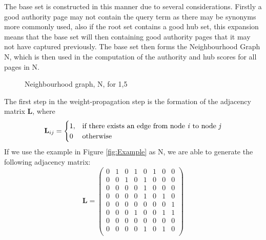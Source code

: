 \documentclass[11pt]{report}
\begin{document}
The base set is constructed in this manner due to several considerations. Firstly a good authority page may not contain the query term  as there may be synonyms more commonly used, also if the root set contains a good hub set, this expansion means that the base set will then containing good authority pages that it may not have captured previously. The base set then forms the Neighbourhood Graph N, which is then used in the computation of the authority and hub scores for all pages in N.

\begin{figure}[H]
\centering
{}
\caption{Neighbourhood graph, N,  for {1,5}}
\end{figure}

The first step in the weight-propagation step is the formation of the adjacency matrix \textbf{L}, where \[\textbf{L}_{ij} = \begin{cases} 1, & \textnormal{if there exists an edge from node \textit{i} to node \textit{j}}\\ 0 & \textnormal{otherwise}
\end{cases}\]
If we use the example in Figure \ref{fig:Example} as N, we are able to generate the following adjacency matrix:
\begin{equation*}
\textbf{L}=\left(
\begin{array}{cccccccc}
0 & 1 & 0 & 1 & 0 & 1 & 0 & 0 \\
0 & 0 & 1 & 0 & 1 & 0 & 0 & 0 \\
0 & 0 & 0 & 0 & 1 & 0 & 0 & 0 \\
0 & 0 & 0 & 0 & 1 & 0 & 1 & 0 \\
0 & 0 & 0 & 0 & 0 & 0 & 0 & 1 \\
0 & 0 & 0 & 1 & 0 & 0 & 1 & 1 \\
0 & 0 & 0 & 0 & 0 & 0 & 0 & 0 \\
0 & 0 & 0 & 0 & 1 & 0 & 1 & 0 \\
\end{array}
\right)
\end{equation*}
\end{document}
